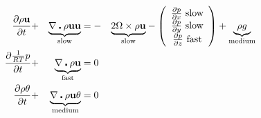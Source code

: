 \begin{alignat*}{3}
\frac{\partial\mathbf{\rho u}}{\partial t} & + & \underset{\textnormal{slow}}{\underbrace{\mathbf{\nabla\centerdot\rho u}\mathbf{u}}} & =- & \underset{\textnormal{slow}}{\underbrace{2\Omega\times\rho\mathbf{u}}}-\left(\begin{array}{c}
\frac{\partial p}{\partial x}\textnormal{ slow}\\
\frac{\partial p}{\partial y}\textnormal{ slow}\\
\frac{\partial p}{\partial z}\textnormal{ fast}
\end{array}\right)+\underset{\text{medium}}{\underbrace{\rho g}}\\
\frac{\partial\frac{1}{RT}p}{\partial t} & + & \underset{\text{fast}}{\underbrace{\nabla\centerdot\rho\mathbf{u}}} & =0\\
\frac{\partial\rho\theta}{\partial t} & + & \underset{\text{medium}}{\underbrace{\nabla\centerdot\rho\mathbf{u}\theta}} & =0
\end{alignat*}

